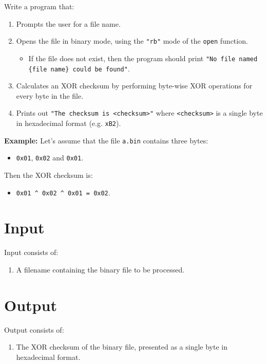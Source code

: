 
Write a program that:
\begin{enumerate}
    \item Prompts the user for a file name.
    \item Opens the file in binary mode, using the \texttt{"rb"} mode of the \texttt{open} function.
    \begin{itemize}
        \item If the file does not exist, then the program should print \texttt{"No file named \{file name\} could be found"}.
    \end{itemize}
    \item Calculates an XOR checksum by performing byte-wise XOR operations for every byte in the file.
    \item Prints out \texttt{"The checksum is <checksum>"} where \texttt{<checksum>} is a single byte in hexadecimal format (e.g. \texttt{xB2}).
\end{enumerate}

\textbf{Example:} 
Let's assume that the file \texttt{a.bin} contains three bytes:
\begin{itemize}
    \item \texttt{0x01}, \texttt{0x02} and \texttt{0x01}.
\end{itemize}
Then the XOR checksum is:
\begin{itemize}
    \item \texttt{0x01 \textasciicircum{} 0x02 \textasciicircum{} 0x01 = 0x02}.
\end{itemize}

\section*{Input}
Input consists of:
\begin{enumerate}
    \item A filename containing the binary file to be processed.
\end{enumerate}

\section*{Output}
Output consists of:
\begin{enumerate}
    \item The XOR checksum of the binary file, presented as a single byte in hexadecimal format.
\end{enumerate}
